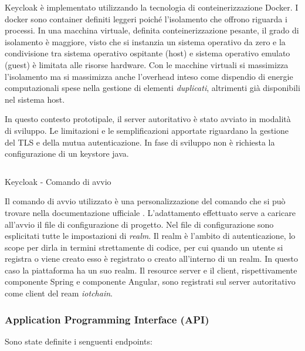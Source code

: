\documentclass[a4paper,11pt]{article}
\begin{document}
Keycloak è implementato utilizzando la tecnologia di conteinerizzazione Docker. I docker sono container definiti leggeri poiché l'isolamento che offrono riguarda i processi. In una macchina virtuale, definita conteinerizzazione pesante, il grado di isolamento è maggiore, visto che si instanzia un sistema operativo da zero e la condivisione tra sistema operativo ospitante (host) e sistema operativo emulato (guest) è limitata alle risorse hardware. Con le macchine virtuali si massimizza l'isolamento ma si massimizza anche l'overhead inteso come dispendio di energie computazionali spese nella gestione di elementi \textit{duplicati}, altrimenti già disponibili nel sistema host. \cite{dockerWhatContainer}

In questo contesto prototipale, il server autoritativo è stato avviato in modalità di sviluppo. Le limitazioni e le semplificazioni apportate riguardano la gestione del TLS e della mutua autenticazione. In fase di sviluppo non è richiesta la configurazione di un keystore java.

\begin{listing}
  \inputminted{shell}{./code/avvio.kc.sh}
  \caption{Keycloak - Comando di avvio}
  \label{listing:avviokc}
\end{listing}

Il comando di avvio utilizzato è una personalizzazione del comando che si può trovare nella documentazione ufficiale \cite{keycloakDockerKeycloak}. L'adattamento effettuato serve a caricare all'avvio il file di configurazione di progetto. Nel file di configurazione sono esplicitati tutte le impostazioni di \textit{realm}. Il realm è l'ambito di autenticazione, lo scope per dirla in termini strettamente di codice, per cui quando un utente si registra o viene creato esso è registrato o creato all'interno di un realm. In questo caso la piattaforma ha un suo realm. Il resource server e il client, rispettivamente componente Spring e componente Angular, sono registrati sul server autoritativo come client del ream \textit{iotchain}.

\subsubsection{Application Programming Interface (API)}

Sono state definite i senguenti endpoints:
\end{document}
